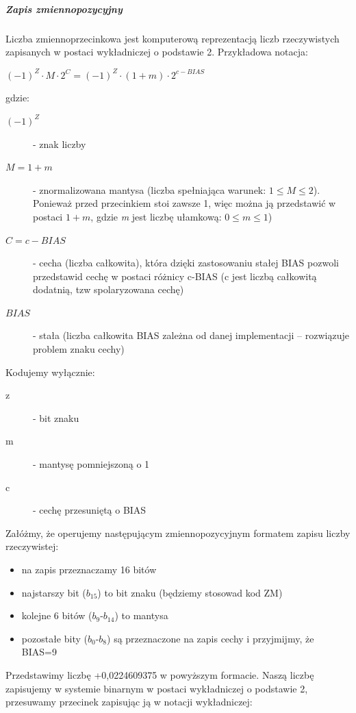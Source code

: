\documentclass[a4paper,12pt,oneside]{book}
\begin{document}
			\subparagraph{Zapis zmiennopozycyjny}
			
			Liczba zmiennoprzecinkowa jest komputerową reprezentacją liczb rzeczywistych zapisanych w postaci wykładniczej
			o podstawie 2. Przykładowa notacja:
			
			\begin{center}
				$(-1)^Z \cdot M \cdot 2^C = (-1)^Z \cdot (1+m) \cdot 2^{c - BIAS}$
			\end{center}
			gdzie:
			\begin{description}
				\item[$(-1)^Z$] - znak liczby
				\item[$M=1+m$] - znormalizowana mantysa (liczba spełniająca warunek: $1 \leq M \leq 2$). Ponieważ przed przecinkiem stoi zawsze 1, więc można ją przedstawić w postaci $1+m$, gdzie \emph{m} jest liczbę ułamkową: $0 \leq m \leq 1$)
				\item[$C=c-BIAS$] - cecha (liczba całkowita), która dzięki zastosowaniu stałej BIAS pozwoli przedstawid cechę w postaci
				różnicy c-BIAS (c jest liczbą całkowitą dodatnią, tzw spolaryzowana cechę)
				\item[$BIAS$] - stała (liczba całkowita BIAS zależna od danej implementacji – rozwiązuje problem znaku cechy)
			\end{description}
			Kodujemy wyłącznie:
			\begin{description}
				\item[z] - bit znaku
				\item[m] - mantysę pomniejszoną o 1
				\item[c] - cechę przesuniętą o BIAS
			\end{description}
			
			Załóżmy, że operujemy następującym zmiennopozycyjnym formatem zapisu liczby rzeczywistej:
			\begin{itemize}
				\item na zapis przeznaczamy 16 bitów
				\item najstarszy bit ($b_{15}$) to bit znaku (będziemy stosowad kod ZM)
				\item kolejne 6 bitów ($b_{9}$-$b_{14}$) to mantysa
				\item pozostałe bity ($b_0$-$b_8$) są przeznaczone na zapis cechy i przyjmijmy, że BIAS=9
			\end{itemize}
			
			Przedstawimy liczbę +0,0224609375 w powyższym formacie. Naszą liczbę zapisujemy w systemie binarnym w
			postaci wykładniczej o podstawie 2, przesuwamy przecinek zapisując ją w notacji wykładniczej:
			
\end{document}
